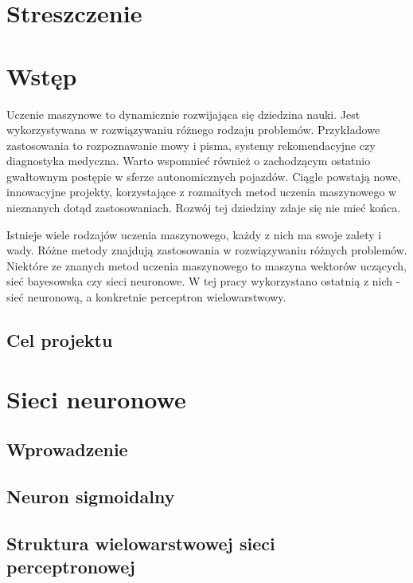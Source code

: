 


\maketitle
\tableofcontents

\chapter{Streszczenie}


\chapter{Wstęp}
Uczenie maszynowe to dynamicznie rozwijająca się dziedzina nauki. Jest wykorzystywana w rozwiązywaniu różnego rodzaju problemów. Przykładowe zastosowania to rozpoznawanie mowy i pisma, systemy rekomendacyjne czy diagnostyka medyczna. Warto wspomnieć również o zachodzącym ostatnio gwałtownym postępie w sferze autonomicznych pojazdów. Ciągle powstają nowe, innowacyjne projekty, korzystające z rozmaitych metod uczenia maszynowego w nieznanych dotąd zastosowaniach. Rozwój tej dziedziny zdaje się nie mieć końca.

Istnieje wiele rodzajów uczenia maszynowego, każdy z nich ma swoje zalety i wady. Różne metody znajdują zastosowania w rozwiązywaniu różnych problemów. Niektóre ze znanych metod uczenia maszynowego to maszyna wektorów uczących, sieć bayesowska czy sieci neuronowe. W tej pracy wykorzystano ostatnią z nich - sieć neuronową, a konkretnie perceptron wielowarstwowy.
\section{Cel projektu}

\chapter{Sieci neuronowe}
\section{Wprowadzenie}
\section{Neuron sigmoidalny}
\section{Struktura wielowarstwowej sieci perceptronowej}
